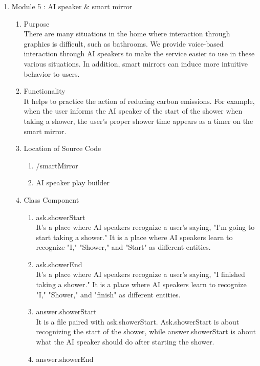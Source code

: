 \documentclass[11pt, conference]{IEEEtran}
\begin{document}
\begin{enumerate}[label=\arabic*]
    \item {\large{Module 5 : AI speaker \& smart mirror}}
    \begin{enumerate}[label=\alph*]
        \item Purpose\\
        There are many situations in the home where interaction through graphics is difficult, such as bathrooms. We provide voice-based interaction through AI speakers to make the service easier to use in these various situations. In addition, smart mirrors can induce more intuitive behavior to users.\\
        \item Functionality\\
        It helps to practice the action of reducing carbon emissions. For example, when the user informs the AI speaker of the start of the shower when taking a shower, the user's proper shower time appears as a timer on the smart mirror.\\
        \item Location of Source Code
        \begin{enumerate}
            \item /smartMirror
            \item AI speaker play builder\\
        \end{enumerate}
        \item Class Component
        \begin{enumerate}
            \item ask.showerStart\\
            It's a place where AI speakers recognize a user's saying, "I'm going to start taking a shower." It is a place where AI speakers learn to recognize "I," "Shower," and "Start" as different entities.
            \item ask.showerEnd\\
            It's a place where AI speakers recognize a user's saying, "I finished taking a shower." It is a place where AI speakers learn to recognize "I," "Shower," and "finish" as different entities.
            \item answer.showerStart\\
            It is a file paired with ask.showerStart. Ask.showerStart is about recognizing the start of the shower, while answer.showerStart is about what the AI speaker should do after starting the shower.
            \item answer.showerEnd\\

\end{enumerate}
\end{enumerate}
\end{enumerate}
\end{document}
